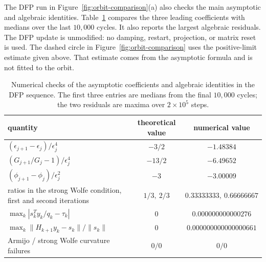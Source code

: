 \documentclass[11pt]{article}
\begin{document}
The DFP run in Figure~\ref{fig:orbit-comparison}(a) also checks the main
asymptotic and algebraic identities.  Table~\ref{tab:recurrence-verification}
compares the three leading coefficients with medians over the last $10{,}000$
cycles.  It also reports the largest algebraic residuals.  The DFP update is
unmodified: no damping, restart, projection, or matrix reset is used.  The
dashed circle in Figure~\ref{fig:orbit-comparison} uses the positive-limit
estimate given above.  That estimate comes from the asymptotic formula and is
not fitted to the orbit.

\begin{table}[!htbp]
\caption{Numerical checks of the asymptotic coefficients and algebraic
identities in the DFP sequence.  The first three entries are medians from the
final $10{,}000$ cycles; the two residuals are maxima over $2\times10^5$
steps.}
\label{tab:recurrence-verification}
\centering
\small
\setlength{\tabcolsep}{3.5pt}
\begin{tabular}{@{}p{6.1cm}cc@{}}
\toprule
quantity & theoretical value & numerical value\\
\midrule
$(\epsilon_{j+1}-\epsilon_j)/\epsilon_j^4$
  & $-3/2$ & $-1.48384$\\
$(G_{j+1}/G_j-1)/\epsilon_j^4$
  & $-13/2$ & $-6.49652$\\
$(\phi_{j+1}-\phi_j)/\epsilon_j^2$
  & $-3$ & $-3.00009$\\
ratios in the strong Wolfe condition, first and second iterations
  & $1/3,\ 2/3$ & $0.33333333,\ 0.66666667$\\
$\max_k|s_k^Ty_k/q_k-\tau_k|$
  & $0$ & $0.000000000000276$\\
$\max_k\|H_{k+1}y_k-s_k\|/\|s_k\|$
  & $0$ & $0.000000000000000661$\\
Armijo / strong Wolfe curvature failures
  & $0/0$ & $0/0$\\
\bottomrule
\end{tabular}
\end{table}
\FloatBarrier
\end{document}
